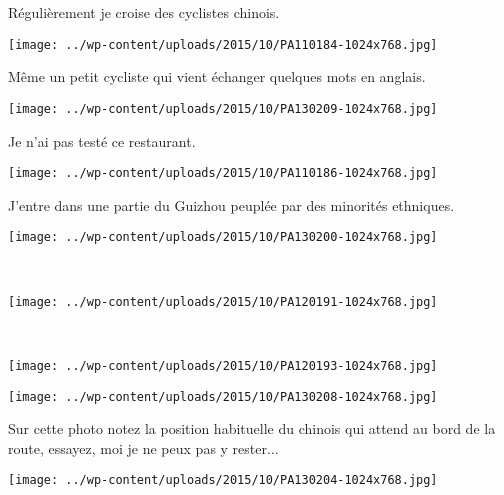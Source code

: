  Régulièrement je croise des cyclistes chinois. 
\begin{center} \texttt{[image: ../wp-content/uploads/2015/10/PA110184-1024x768.jpg]} \end{center}

 Même un petit cycliste qui vient échanger quelques mots en anglais. 
\begin{center} \texttt{[image: ../wp-content/uploads/2015/10/PA130209-1024x768.jpg]} \end{center}
\vspace{-\topsep}
\pagebreak
 
 Je n'ai pas testé ce restaurant. 
\begin{center} \texttt{[image: ../wp-content/uploads/2015/10/PA110186-1024x768.jpg]} \end{center}

 J'entre dans une partie du Guizhou peuplée par des minorités ethniques. 
\begin{center} \texttt{[image: ../wp-content/uploads/2015/10/PA130200-1024x768.jpg]} \end{center}
\vspace{-\topsep}
\pagebreak

~
\vspace{0.5mm}
\begin{center} \texttt{[image: ../wp-content/uploads/2015/10/PA120191-1024x768.jpg]} \end{center}

~
\begin{center} \texttt{[image: ../wp-content/uploads/2015/10/PA120193-1024x768.jpg]} \end{center}
\begin{center} \texttt{[image: ../wp-content/uploads/2015/10/PA130208-1024x768.jpg]} \end{center}

\vspace{2.1mm}
 Sur cette photo notez la position habituelle du chinois qui attend au bord de la route, essayez, moi je ne peux pas y rester...
 \vspace{2.1mm}
\begin{center} \texttt{[image: ../wp-content/uploads/2015/10/PA130204-1024x768.jpg]} \end{center}

